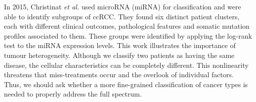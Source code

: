 In 2015, Christinat \textit{et al.} used microRNA (miRNA) for classification and were able to identify subgroups of ccRCC. They found six distinct patient clusters, each with different clinical outcomes, pathological features and somatic mutation profiles associated to them. These groups were identified by applying the log-rank test to the miRNA expression levels. \cite{Christinat2015Integrated} This work illustrates the importance of tumour heterogeneity. Although we classify two patients as having the same disease, the cellular characteristics can be completely different. This nonlinearity threatens that miss-treatments occur and the overlook of individual factors. Thus, we should ask whether a more fine-grained classification of cancer types is needed to properly address the full spectrum.



